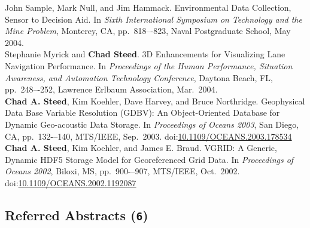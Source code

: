 \documentclass[11pt, a4paper]{article}
\newcommand{\years}[1]{\marginnote{\scriptsize #1}}
\begin{document}
\begin{sloppypar}
John Sample, Mark Null, and Jim Hammack.  Environmental Data Collection,
Sensor to Decision Aid.  In \emph{Sixth International Symposium on Technology
and the Mine Problem}, Monterey, CA, pp.\ 818–-823, Naval Postgraduate
School, May 2004.\\
\years{2004}Stephanie Myrick and \textbf{Chad Steed}.  3D Enhancements for
Visualizing Lane Navigation Performance.  In \emph{Proceedings of the Human
Performance, Situation Awareness, and Automation Technology Conference},
Daytona Beach, FL, pp.\ 248–-252, Lawrence Erlbaum Association, Mar.\ 2004.\\
\years{2003}\textbf{Chad A. Steed}, Kim Koehler, Dave Harvey, and Bruce
Northridge.  Geophysical Data Base Variable Resolution (GDBV): An
Object-Oriented Database for Dynamic Geo-acoustic Data Storage.  In
\emph{Proceedings of Oceans 2003}, San Diego, CA, pp.\ 132-–140, MTS/IEEE,
Sep.\ 2003. doi:\href{http://dx.doi.org/10.1109/OCEANS.2003.178534}
{10.1109/OCEANS.2003.178534}\\
\years{2002}\textbf{Chad A. Steed}, Kim Koehler, and James E. Braud.
VGRID: A Generic, Dynamic HDF5 Storage Model for Georeferenced Grid Data.
In \emph{Proceedings of Oceans 2002}, Biloxi, MS, pp.\ 900-–907,
MTS/IEEE, Oct.\ 2002. doi:\href{http://dx.doi.org/10.1109/OCEANS.2002.1192087}
{10.1109/OCEANS.2002.1192087}
\end{sloppypar}

\subsection*{Referred Abstracts (\texttt{6})}
\end{document}
